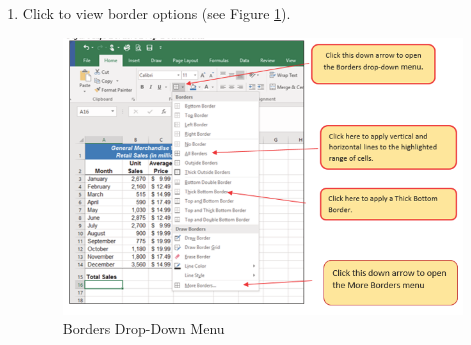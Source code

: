 \begin{enumbox}
	\begin{enumerate}
		\item Click  to view border options (see Figure \ref{01:fig42}).

		\begin{figure}[H]
			\centering
			\includegraphics[width=\maxwidth{.95\linewidth}]{gfx/ch01_fig42}
			\caption{Borders Drop-Down Menu}
			\label{01:fig42}
		\end{figure}


\end{enumerate}
\end{enumbox}
